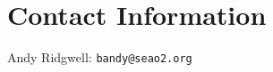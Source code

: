 \documentclass[10pt,twoside]{article}
\begin{document}



\newpage
\section{Contact Information}

\begin{compactitem}
        \item Andy Ridgwell: \texttt{bandy@seao2.org}
\end{compactitem}

\end{document}
